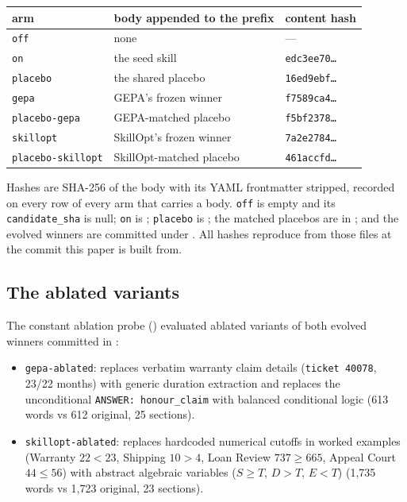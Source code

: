 \begin{center}
\begin{tabular}{lll}
\toprule
arm & body appended to the prefix & content hash \\
\midrule
\texttt{off} & none & --- \\
\texttt{on} & the seed skill & \texttt{edc3ee70\ldots} \\
\texttt{placebo} & the shared placebo & \texttt{16ed9ebf\ldots} \\
\texttt{gepa} & GEPA's frozen winner & \texttt{f7589ca4\ldots} \\
\texttt{placebo-gepa} & GEPA-matched placebo & \texttt{f5bf2378\ldots} \\
\texttt{skillopt} & SkillOpt's frozen winner & \texttt{7a2e2784\ldots} \\
\texttt{placebo-skillopt} & SkillOpt-matched placebo & \texttt{461accfd\ldots} \\
\bottomrule
\end{tabular}
\end{center}

Hashes are SHA-256 of the body with its YAML frontmatter stripped, recorded
on every row of every arm that carries a body. \texttt{off} is empty and its
\texttt{candidate\_sha} is null; \texttt{on} is
; \texttt{placebo} is
; the matched placebos are in
; and the evolved winners are committed under
. All hashes reproduce from those files at the commit
this paper is built from.

\subsection{The ablated variants}

The constant ablation probe () evaluated ablated variants of
both evolved winners committed in :
\begin{itemize}
  \item \texttt{gepa-ablated}: replaces verbatim warranty claim details
    (\texttt{ticket 40078}, 23/22 months) with generic duration extraction and
    replaces the unconditional \texttt{ANSWER: honour\_claim} with balanced
    conditional logic (613 words vs 612 original, 25 sections).
  \item \texttt{skillopt-ablated}: replaces hardcoded numerical cutoffs in worked
    examples (Warranty $22 < 23$, Shipping $10 > 4$, Loan Review $737 \ge 665$,
    Appeal Court $44 \le 56$) with abstract algebraic variables ($S \ge T$,
    $D > T$, $E < T$) (1,735 words vs 1,723 original, 23 sections).
\end{itemize}

